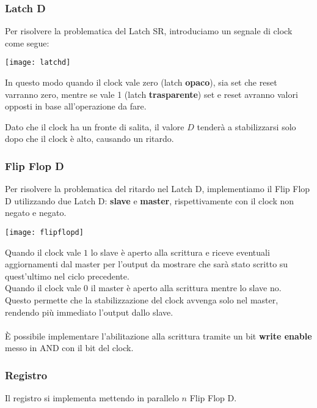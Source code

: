 \subsubsection{Latch D}
Per risolvere la problematica del Latch SR, introduciamo un segnale di clock come segue:
\begin{center}
	\texttt{[image: latchd]}
\end{center}
In questo modo quando il clock vale zero (latch \textbf{opaco}), sia set che reset varranno zero, mentre se vale 1 (latch \textbf{trasparente}) set e reset avranno valori opposti in base all'operazione da fare.
\begin{observation}
	Dato che il clock ha un fronte di salita, il valore $D$ tenderà a stabilizzarsi solo dopo che il clock è alto, causando un ritardo.
\end{observation}

\subsubsection{Flip Flop D}
Per risolvere la problematica del ritardo nel Latch D, implementiamo il Flip Flop D utilizzando due Latch D: \textbf{slave} e \textbf{master}, rispettivamente con il clock non negato e negato.
\begin{center}
	\texttt{[image: flipflopd]}
\end{center}
Quando il clock vale $1$ lo slave è aperto alla scrittura e riceve eventuali aggiornamenti dal master per l'output da mostrare che sarà stato scritto su quest'ultimo nel ciclo precedente.\\
Quando il clock vale $0$ il master è aperto alla scrittura mentre lo slave no.\\
Questo permette che la stabilizzazione del clock avvenga solo nel master, rendendo più immediato l'output dallo slave.\\\\
È possibile implementare l'abilitazione alla scrittura tramite un bit \textbf{write enable} messo in AND con il bit del clock.

\subsubsection{Registro}
Il registro si implementa mettendo in parallelo $n$ Flip Flop D.

